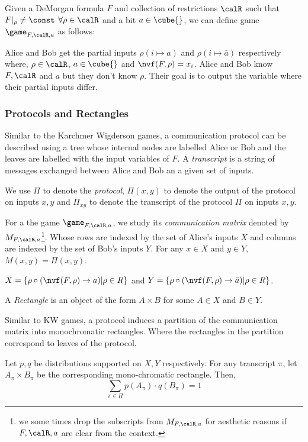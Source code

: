 
Given a DeMorgan formula $F$ and collection of restrictions $\calR$ such that $F|_{\rho} \neq \const$ $\forall \rho \in \calR$ and a bit $a\in \cube{}$, we can define game $\game_{F,\calR,a}$ as follows:

Alice and Bob get the partial inputs $\rho(i \mapsto a)$ and $\rho(i \mapsto \bar{a})$ respectively where, $\rho \in \calR$, $a \in \cube{}$ and $\nvf(F,\rho) = x_i$. Alice and Bob know $F, \calR$ and $a$ but they don't know $\rho$. 
Their goal is to output the variable where their partial inputs differ.  

\subsubsection{Protocols and Rectangles} 
    Similar to the Karchmer Wigderson games, a communication protocol can be described using a tree whose internal nodes are labelled Alice or Bob and the leaves are labelled with the input variables of $F$. A \emph{transcript} is a string of messages exchanged between Alice and  Bob an a given set of inputs.
    
    We use $\Pi$ to denote the \emph{protocol}, $\Pi(x,y)$ to denote the output of the protocol on inputs $x,y$ and $\Pi_{xy}$ to denote the transcript of the protocol $\Pi$ on inputs $x,y$.  
    
    For a the game $\game_{F,\calR,a}$, we study its \emph{communication matrix} denoted by $M_{F,\calR,a}$\footnote{we some times drop the subscripts from $M_{F,\calR,a}$ for aesthetic reasons if $F,\calR,a$ are clear from the context.}.
    Whose rows are indexed by the set of Alice's inputs $X$ and columns are indexed by the set of Bob's inputs $Y$. For any $x \in X$ and $y \in Y$, $M(x,y) = \Pi(x,y)$.

    $X = \{\rho \circ (\nvf(F,\rho) \to a) | \rho \in R\}$ and 
    $Y = \{\rho \circ (\nvf(F,\rho) \to \bar{a}) | \rho \in R\}$. 
    
    A \emph{Rectangle} is an object of the form $A \times B$ for some $A \in X$ and $B \in Y$. 

    Similar to KW games, a protocol induces a partition of the communication matrix into monochromatic rectangles. Where the rectangles in the partition correspond to leaves of the protocol.
    
    \begin{lemma}
    \label{lem: sum of rectangles}
        Let $p,q$ be distributions supported on $X,Y$ respectively. For any transcript $\pi$, let $A_\pi \times B_\pi$ be the corresponding mono-chromatic rectangle. Then,         
            $$\sum_{\pi \in \Pi} p(A_\pi) \cdot q(B_\pi) = 1$$
    \end{lemma}


